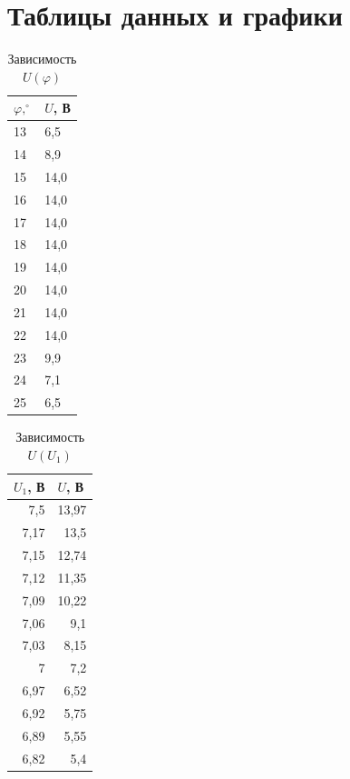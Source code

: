 \documentclass[12pt]{article}
\begin{document}
	\section{Таблицы данных и графики}
	\begin{table}[H]
		\centering
		\begin{tabular}{|l|l|}
			\hline
			$\varphi, ^\circ$     & $U$, В \\ \hline
			13 & 6,5    \\ \hline
			14 & 8,9    \\ \hline
			15 & 14,0   \\ \hline
			16 & 14,0   \\ \hline
			17 & 14,0   \\ \hline
			18 & 14,0   \\ \hline
			19 & 14,0   \\ \hline
			20 & 14,0   \\ \hline
			21 & 14,0   \\ \hline
			22 & 14,0   \\ \hline
			23 & 9,9    \\ \hline
			24 & 7,1    \\ \hline
			25 & 6,5    \\ \hline
		\end{tabular}
		\caption{Зависимость $U(\varphi)$}
	\end{table}
	\begin{table}[H]
		\centering
		\begin{tabular}{|r|r|}
			\hline
			\multicolumn{1}{|l|}{$U_1$, В} & \multicolumn{1}{l|}{$U$, В} \\ \hline
			7,5                            & 13,97                       \\ \hline
			7,17                           & 13,5                        \\ \hline
			7,15                           & 12,74                       \\ \hline
			7,12                           & 11,35                       \\ \hline
			7,09                           & 10,22                       \\ \hline
			7,06                           & 9,1                         \\ \hline
			7,03                           & 8,15                        \\ \hline
			7                              & 7,2                         \\ \hline
			6,97                           & 6,52                        \\ \hline
			6,92                           & 5,75                        \\ \hline
			6,89                           & 5,55                        \\ \hline
			6,82                           & 5,4                         \\ \hline
		\end{tabular}
	\caption{Зависимость $U(U_1)$}
	\end{table}
\end{document}
